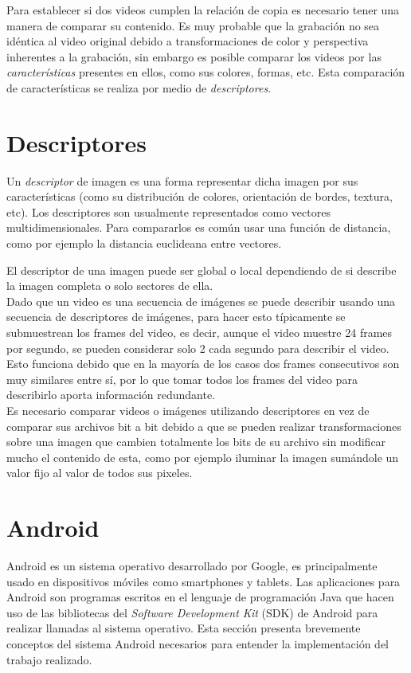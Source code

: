 Para establecer si dos videos cumplen la relación de copia es necesario tener una manera de comparar su contenido. Es muy probable que la grabación no sea idéntica al video original debido a transformaciones de color y perspectiva inherentes a la grabación, sin embargo es posible comparar los videos por las \textit{características} presentes en ellos, como sus colores, formas, etc. Esta comparación de características se realiza por medio de \emph{descriptores}.

\section{Descriptores}\label{descriptores}
Un \emph{descriptor} de imagen es una forma representar dicha imagen por sus características (como su distribución de colores, orientación de bordes, textura, etc). Los descriptores son usualmente representados como vectores multidimensionales. Para compararlos es común usar una función de distancia, como por ejemplo la distancia euclideana entre vectores.

El descriptor de una imagen puede ser global o local dependiendo de si describe la imagen completa o solo sectores de ella. \\
Dado que un video es una secuencia de imágenes se puede describir usando una secuencia de descriptores de imágenes, para hacer esto típicamente se submuestrean los frames del video, es decir, aunque el video muestre 24 frames por segundo, se pueden considerar solo 2 cada segundo para describir el video. Esto funciona debido que en la mayoría de los casos dos frames consecutivos son muy similares entre sí, por lo que tomar todos los frames del video para describirlo aporta información redundante.\\
Es necesario comparar videos o imágenes utilizando descriptores en vez de comparar sus archivos bit a bit debido a que se pueden realizar transformaciones sobre una imagen que cambien totalmente los bits de su archivo sin modificar mucho el contenido de esta, como por ejemplo iluminar la imagen sumándole un valor fijo al valor de todos sus pixeles.

\section{Android}\label{android}
Android es un sistema operativo desarrollado por Google, es principalmente usado en dispositivos móviles como smartphones y tablets. Las aplicaciones para Android son programas escritos en el lenguaje de programación Java que hacen uso de las bibliotecas del \emph{Software Development Kit} (SDK) de Android para realizar llamadas al sistema operativo. Esta sección presenta brevemente conceptos del sistema Android necesarios para entender la implementación del trabajo realizado.

